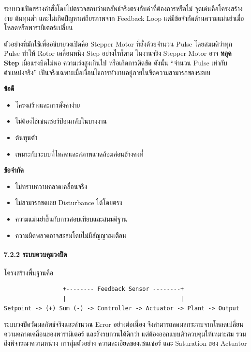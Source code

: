 ระบบวงเปิดสร้างคำสั่งโดยไม่ตรวจสอบว่าผลลัพธ์จริงตรงกับค่าที่ต้องการหรือไม่ จุดเด่นคือโครงสร้างง่าย ต้นทุนต่ำ และไม่เกิดปัญหาเสถียรภาพจาก Feedback Loop แต่มีข้อจำกัดด้านความแม่นยำเมื่อโหลดหรือพารามิเตอร์เปลี่ยน

ตัวอย่างที่มักใช้เพื่ออธิบายวงเปิดคือ Stepper Motor ที่สั่งด้วยจำนวน Pulse โดยสมมติว่าทุก Pulse ทำให้ Rotor เคลื่อนหนึ่ง Step อย่างไรก็ตาม ในงานจริง Stepper Motor อาจ \textbf{หลุด Step} เมื่อแรงบิดไม่พอ ความเร่งสูงเกินไป หรือเกิดการติดขัด ดังนั้น “จำนวน Pulse เท่ากับตำแหน่งจริง” เป็นจริงเฉพาะเมื่อเงื่อนไขการทำงานอยู่ภายในขีดความสามารถของระบบ

\textbf{ข้อดี}

\begin{itemize}
    \item โครงสร้างและการตั้งค่าง่าย
    \item ไม่ต้องใช้เซนเซอร์ป้อนกลับในบางงาน
    \item ต้นทุนต่ำ
    \item เหมาะกับระบบที่โหลดและสภาพแวดล้อมค่อนข้างคงที่
\end{itemize}

\textbf{ข้อจำกัด}

\begin{itemize}
    \item ไม่ทราบความคลาดเคลื่อนจริง
    \item ไม่สามารถชดเชย Disturbance ได้โดยตรง
    \item ความแม่นยำขึ้นกับการสอบเทียบและสมมติฐาน
    \item ความผิดพลาดอาจสะสมโดยไม่มีสัญญาณเตือน
\end{itemize}

\paragraph{7.2.2 ระบบควบคุมวงปิด}

โครงสร้างพื้นฐานคือ

\begin{verbatim}
                 +-------- Feedback Sensor --------+
                 |                                 |
Setpoint -> (+) Sum (-) -> Controller -> Actuator -> Plant -> Output
\end{verbatim}

ระบบวงปิดวัดผลลัพธ์จริงและคำนวณ Error อย่างต่อเนื่อง จึงสามารถลดผลกระทบจากโหลดเปลี่ยน ความคลาดเคลื่อนของพารามิเตอร์ และสิ่งรบกวนได้ดีกว่า แต่ต้องออกแบบตัวควบคุมให้เหมาะสม รวมถึงพิจารณาความหน่วง การสุ่มตัวอย่าง ความละเอียดของเซนเซอร์ และ Saturation ของ Actuator

